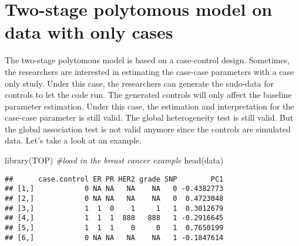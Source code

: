 \documentclass[11pt,]{article}
\newenvironment{Shaded}{\begin{snugshade}}{\end{snugshade}}
\newcommand{\CommentTok}[1]{\textcolor[rgb]{0.56,0.35,0.01}{\textit{#1}}}
\newcommand{\FunctionTok}[1]{\textcolor[rgb]{0.00,0.00,0.00}{#1}}
\newcommand{\NormalTok}[1]{#1}
\begin{document}
\hypertarget{two-stage-polytomous-model-on-data-with-only-cases}{%
\section{Two-stage polytomous model on data with only
cases}\label{two-stage-polytomous-model-on-data-with-only-cases}}

The two-stage polytomous model is based on a case-control design.
Sometimes, the researchers are interested in estimating the case-case
parameters with a case only study. Under this case, the researchers can
generate the sudo-data for controls to let the code run. The generated
controls will only affect the baseline parameter estimation. Under this
case, the estimation and interpretation for the case-case parameter is
still valid. The global heterogeneity test is still valid. But the
global association test is not valid anymore since the controls are
simulated data. Let's take a look at an example.

\begin{Shaded}
\begin{Highlighting}[]
\FunctionTok{library}\NormalTok{(TOP)}
\CommentTok{\#load in the breast cancer example}
\FunctionTok{head}\NormalTok{(data)}
\end{Highlighting}
\end{Shaded}

\begin{verbatim}
##      case.control ER PR HER2 grade SNP        PC1
## [1,]            0 NA NA   NA    NA   0 -0.4382773
## [2,]            0 NA NA   NA    NA   0  0.4723048
## [3,]            1  1  0    1     1   1  0.3012679
## [4,]            1  1  1  888   888   1 -0.2916645
## [5,]            1  1  1    0     0   1  0.7650199
## [6,]            0 NA NA   NA    NA   1 -0.1847614
\end{verbatim}
\end{document}
